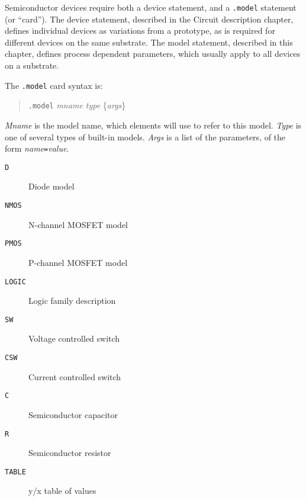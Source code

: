 Semiconductor devices require both a device statement, and a {\tt .model}
statement (or ``card'').  The device statement, described in the Circuit
description chapter, defines individual devices as variations from a
prototype, as is required for different devices on the same substrate.  The
model statement, described in this chapter, defines process dependent
parameters, which usually apply to all devices on a substrate.

The {\tt .model} card syntax is:
\begin{verse}
{\tt .model} {\it mname type} \{{\it args}\}
\end{verse}

{\it Mname} is the model name, which elements will use to refer to this
model.  {\it Type} is one of several types of built-in models.  {\it Args}
is a list of the parameters, of the form {\it name}{\tt =}{\it value}.

\begin{description}

\item[{\tt D}] Diode model

\item[{\tt NMOS}] N-channel MOSFET model

\item[{\tt PMOS}] P-channel MOSFET model

\item[{\tt LOGIC}] Logic family description

\item[{\tt SW}] Voltage controlled switch

\item[{\tt CSW}] Current controlled switch

\item[{\tt C}] Semiconductor capacitor

\item[{\tt R}] Semiconductor resistor

\item[{\tt TABLE}] y/x table of values

\end{description}
